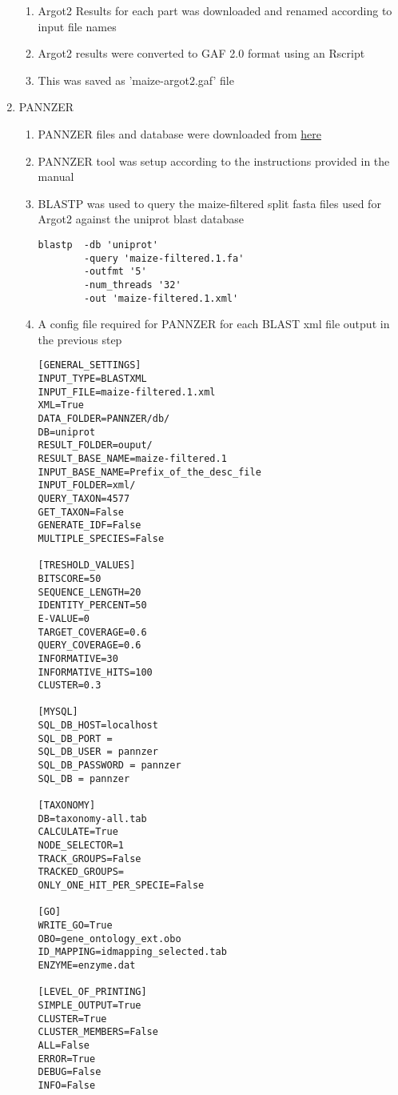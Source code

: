 \begin{enumerate}
\begin{enumerate}
       \item Argot2 Results for each part was downloaded and renamed according to input file names
       \item Argot2 results were converted to GAF 2.0 format using an Rscript
       \item This was saved as 'maize-argot2.gaf' file
    \end{enumerate}
    \item PANNZER
    \begin{enumerate}
      \item PANNZER files and database were downloaded from \href{http://ekhidna.biocenter.helsinki.fi/pannzer/Download.html}{here}
      \item PANNZER tool was setup according to the instructions provided in the manual
      \item BLASTP was used to query the maize-filtered split fasta files used for Argot2 against the uniprot blast database
      \begin{verbatim}
blastp  -db 'uniprot'
        -query 'maize-filtered.1.fa'
        -outfmt '5'
        -num_threads '32'
        -out 'maize-filtered.1.xml'
      \end{verbatim}
      \item A config file required for PANNZER for each BLAST xml file output in the previous step
      \begin{lstlisting}[breaklines]
[GENERAL_SETTINGS]
INPUT_TYPE=BLASTXML
INPUT_FILE=maize-filtered.1.xml
XML=True
DATA_FOLDER=PANNZER/db/
DB=uniprot
RESULT_FOLDER=ouput/
RESULT_BASE_NAME=maize-filtered.1
INPUT_BASE_NAME=Prefix_of_the_desc_file
INPUT_FOLDER=xml/
QUERY_TAXON=4577
GET_TAXON=False
GENERATE_IDF=False
MULTIPLE_SPECIES=False

[TRESHOLD_VALUES]
BITSCORE=50
SEQUENCE_LENGTH=20
IDENTITY_PERCENT=50
E-VALUE=0
TARGET_COVERAGE=0.6
QUERY_COVERAGE=0.6
INFORMATIVE=30
INFORMATIVE_HITS=100
CLUSTER=0.3

[MYSQL]
SQL_DB_HOST=localhost
SQL_DB_PORT =
SQL_DB_USER = pannzer
SQL_DB_PASSWORD = pannzer
SQL_DB = pannzer

[TAXONOMY]
DB=taxonomy-all.tab
CALCULATE=True
NODE_SELECTOR=1
TRACK_GROUPS=False
TRACKED_GROUPS=
ONLY_ONE_HIT_PER_SPECIE=False

[GO]
WRITE_GO=True
OBO=gene_ontology_ext.obo
ID_MAPPING=idmapping_selected.tab
ENZYME=enzyme.dat

[LEVEL_OF_PRINTING]
SIMPLE_OUTPUT=True
CLUSTER=True
CLUSTER_MEMBERS=False
ALL=False
ERROR=True
DEBUG=False
INFO=False


\end{lstlisting}
\end{enumerate}
\end{enumerate}
